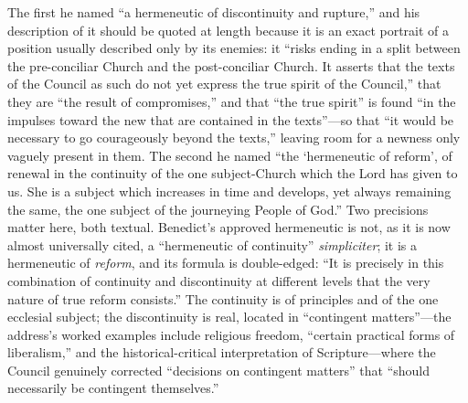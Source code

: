 The first he named ``a hermeneutic of discontinuity and rupture,'' and his description of it should be quoted at length because it is an exact portrait of a position usually described only by its enemies: it ``risks ending in a split between the pre-conciliar Church and the post-conciliar Church. It asserts that the texts of the Council as such do not yet express the true spirit of the Council,'' that they are ``the result of compromises,'' and that ``the true spirit'' is found ``in the impulses toward the new that are contained in the texts''---so that ``it would be necessary to go courageously beyond the texts,'' leaving room for a newness only vaguely present in them. The second he named ``the `hermeneutic of reform', of renewal in the continuity of the one subject-Church which the Lord has given to us. She is a subject which increases in time and develops, yet always remaining the same, the one subject of the journeying People of God.'' Two precisions matter here, both textual. Benedict's approved hermeneutic is not, as it is now almost universally cited, a ``hermeneutic of continuity'' \emph{simpliciter}; it is a hermeneutic of \emph{reform}, and its formula is double-edged: ``It is precisely in this combination of continuity and discontinuity at different levels that the very nature of true reform consists.'' The continuity is of principles and of the one ecclesial subject; the discontinuity is real, located in ``contingent matters''---the address's worked examples include religious freedom, ``certain practical forms of liberalism,'' and the historical-critical interpretation of Scripture---where the Council genuinely corrected ``decisions on contingent matters'' that ``should necessarily be contingent themselves.''


